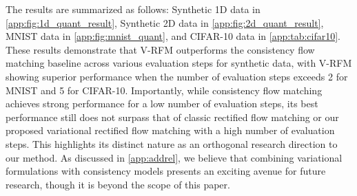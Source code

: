 The results are summarized as follows: Synthetic 1D data in \cref{app:fig:1d_quant_result}, Synthetic 2D data in \cref{app:fig:2d_quant_result}, MNIST data in \cref{app:fig:mnist_quant}, and CIFAR-10 data in \cref{app:tab:cifar10}. These results demonstrate that V-RFM outperforms the consistency flow matching baseline across various evaluation steps for synthetic data, with V-RFM showing superior performance when the number of evaluation steps exceeds 2 for MNIST and 5 for CIFAR-10. Importantly, while consistency flow matching achieves strong performance for a low number of evaluation steps, its best performance still does not surpass that of  classic rectified flow matching or our proposed variational rectified flow matching with a high number of evaluation steps. This highlights its distinct nature as an orthogonal research direction to our method. As discussed in \cref{app:addrel}, we believe that combining variational formulations with consistency models presents an exciting avenue for future research, though it is beyond the scope of this paper.



